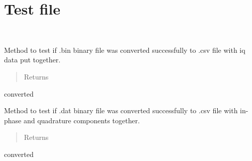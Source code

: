\documentclass[letterpaper,10pt,english]{sphinxmanual}
\begin{document}
\section{Test file}
\label{\detokenize{test:module-test}}\label{\detokenize{test:test-file}}\label{\detokenize{test::doc}}

\begin{fulllineitems}
\label{\detokenize{test:test.TestParser}}~

\begin{fulllineitems}
\label{\detokenize{test:test.TestParser.test_TI}}
Method to test if .bin binary file was converted successfully to .csv file with iq data put together.
\begin{quote}\begin{description}
\item[{Returns}] \leavevmode


\end{description}\end{quote}

converted

\end{fulllineitems}


\begin{fulllineitems}
\label{\detokenize{test:test.TestParser.test_iq}}
Method to test if .dat binary file was converted successfully to .csv file with in-phase and quadrature
components together.
\begin{quote}\begin{description}
\item[{Returns}] \leavevmode


\end{description}\end{quote}

converted

\end{fulllineitems}


\end{fulllineitems}
\end{document}

